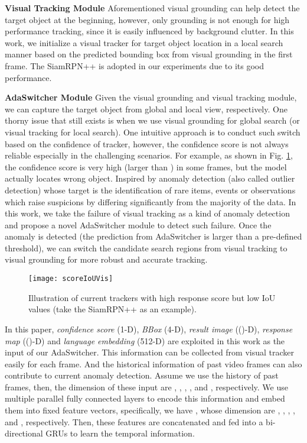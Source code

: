 \documentclass[final]{cvpr}
\begin{document}
\textbf{Visual Tracking Module} 
Aforementioned visual grounding can help detect the target object at the beginning, however, only grounding is not enough for high performance tracking, since it is easily influenced by background clutter. In this work, we initialize a  visual tracker for target object location in a local search manner based on the predicted bounding box from visual grounding in the first frame. The SiamRPN++ \cite{li2018siamrpn++} is adopted in our experiments due to its good performance. 




\textbf{AdaSwitcher Module} 
Given the visual grounding and visual tracking module, we can capture the target object from global and local view, respectively. One thorny issue that still exists is when we use visual grounding for global search (or visual tracking for local search). One intuitive approach is to conduct such switch based on the confidence of tracker, however, the confidence score is not always reliable especially in the challenging scenarios. For example, as shown in Fig. \ref{scoreIoUVis}, the confidence score is very high (larger than ) in some frames, but the model actually locates wrong object. Inspired by anomaly detection (also called outlier detection) whose target is the identification of rare items, events or observations which raise suspicions by differing significantly from the majority of the data. In this work, we take the failure of visual tracking as a kind of anomaly detection and propose a novel AdaSwitcher module to detect such failure. Once the anomaly is detected (the prediction from AdaSwitcher is larger than a pre-defined threshold), we can switch the candidate search regions from visual tracking to visual grounding for more robust and accurate tracking. 


\begin{figure} 
\center
\texttt{[image: scoreIoUVis]}
\caption{Illustration of current trackers with high response score but low IoU values (take the SiamRPN++ \cite{li2018siamrpn++} as an example).}   
\label{scoreIoUVis}
\end{figure} 	


In this paper, \emph{confidence score} (1-D), \emph{BBox} (4-D), \emph{result image} (()-D), \emph{response map} (()-D) and \emph{language embedding} (512-D) are exploited in this work as the input of our AdaSwitcher. This information can be collected from visual tracker easily for each frame. And the historical information of past video frames can also contribute to current anomaly detection. Assume we use the history of past  frames, then, the dimension of these input are , , , , and , respectively. We use multiple parallel fully connected layers to encode this information and embed them into fixed feature vectors, specifically, we have , whose dimension are , , , , and , respectively. Then, these features are concatenated and fed into a bi-directional GRUs \cite{chung2014GRUs} to learn the temporal information. 
\end{document}
